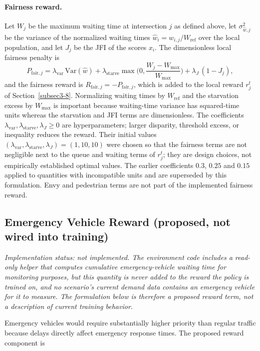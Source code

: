 \documentclass[3p,times]{elsarticle}
\theoremstyle{plain}
\theoremstyle{definition}
\begin{document}
\paragraph{Fairness reward.}
Let $W_j$ be the maximum waiting time at intersection $j$ as defined above, let
$\sigma^2_{\hat w,j}$ be the variance of the normalized waiting times
$\hat w_i=w_{i,j}/W_{\mathrm{ref}}$ over the local population, and let $J_j$ be the JFI of the
scores $x_i$. The dimensionless local fairness penalty is
\begin{equation}
P_{\mathrm{fair},j}=\lambda_{\mathrm{var}}\,\mathrm{Var}(\hat w)
+\lambda_{\mathrm{starve}}\max\!\Big(0,\frac{W_j-W_{\max}}{W_{\max}}\Big)
+\lambda_{J}\,(1-J_j),
\end{equation}
and the fairness reward is $R_{\mathrm{fair},j}=-P_{\mathrm{fair},j}$, which is added to the
local reward $r_j^t$ of Section~\ref{subsec3-8}. Normalizing waiting times by $W_{\mathrm{ref}}$
and the starvation excess by $W_{\max}$ is important because waiting-time variance has
squared-time units whereas the starvation and JFI terms are dimensionless. The coefficients
$\lambda_{\mathrm{var}},\lambda_{\mathrm{starve}},\lambda_J\ge 0$ are hyperparameters; larger
disparity, threshold excess, or inequality reduces the reward. Their initial values
$(\lambda_{\mathrm{var}},\lambda_{\mathrm{starve}},\lambda_J)=(1,10,10)$ were chosen so that the
fairness terms are not negligible next to the queue and waiting terms of $r_j^t$; they are
design choices, not empirically established optimal values. The earlier coefficients $0.3$, $0.25$ and $0.15$ applied to
quantities with incompatible units and are superseded by this formulation. Envy and
pedestrian terms are not part of the implemented fairness reward.

\subsection{Emergency Vehicle Reward (proposed, not wired into training)}

\textit{Implementation status: not implemented. The environment code
includes a read-only helper that computes cumulative emergency-vehicle
waiting time for monitoring purposes, but this quantity is never added
to the reward the policy is trained on, and no scenario's current
demand data contains an emergency vehicle for it to measure. The
formulation below is therefore a proposed reward term, not a
description of current training behavior.}

Emergency vehicles would require substantially higher priority than
regular traffic because delays directly affect emergency response
times. The proposed reward component is
\end{document}
